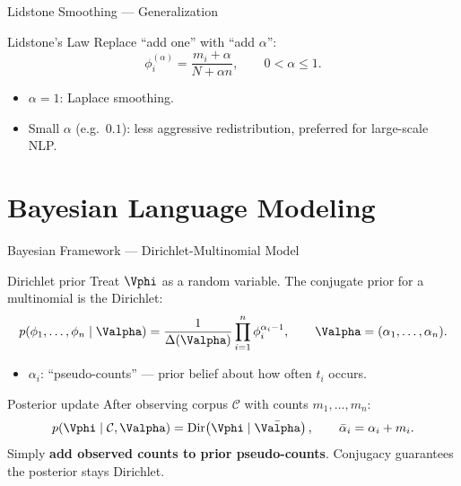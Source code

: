 \begin{frame}{Lidstone Smoothing — Generalization}
  \begin{block}{Lidstone's Law}
    Replace ``add one'' with ``add $\alpha$'':
    \[
      \phi_i^{(\alpha)}=\frac{m_i+\alpha}{N+\alpha n},\qquad 0<\alpha\le1.
    \]
    \begin{itemize}
      \item $\alpha=1$: Laplace smoothing.
      \item Small $\alpha$ (e.g.\ $0.1$): less aggressive redistribution, preferred for large-scale NLP.
    \end{itemize}
  \end{block}
\end{frame}

\section{Bayesian Language Modeling}

\begin{frame}{Bayesian Framework — Dirichlet-Multinomial Model}
  \begin{block}{Dirichlet prior}
    Treat $\Vphi$ as a random variable.  The conjugate prior for a multinomial is the Dirichlet:
    \[
      p(\phi_1,\ldots,\phi_n\mid\Valpha)
      =\frac{1}{\Delta(\Valpha)}\prod_{i=1}^n\phi_i^{\alpha_i-1},
      \qquad\Valpha=(\alpha_1,\ldots,\alpha_n).
    \]
    \begin{itemize}
      \item $\alpha_i$: ``pseudo-counts'' — prior belief about how often $t_i$ occurs.
    \end{itemize}
  \end{block}

  \begin{block}{Posterior update}
    After observing corpus $\mathcal{C}$ with counts $m_1,\ldots,m_n$:
    \[
      p(\Vphi\mid\mathcal{C},\Valpha)=\mathrm{Dir}\!\left(\Vphi\mid\bar\Valpha\right),
      \qquad\bar\alpha_i=\alpha_i+m_i.
    \]
    Simply \textbf{add observed counts to prior pseudo-counts}.
    Conjugacy guarantees the posterior stays Dirichlet.
  \end{block}
\end{frame}

